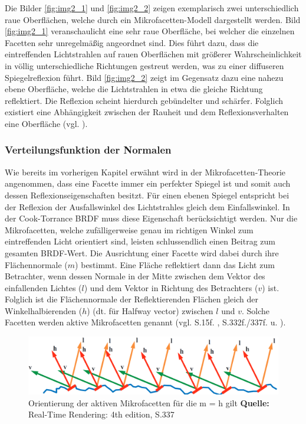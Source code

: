 \documentclass[
  11pt,
  a4paper,
  oneside
  ]{article}
\begin{document}
Die Bilder \ref{fig:img2_1} und \ref{fig:img2_2} zeigen exemplarisch zwei unterschiedlich raue Oberflächen, welche durch ein Mikrofacetten-Modell dargestellt werden. Bild \ref{fig:img2_1} veranschaulicht eine sehr raue Oberfläche, bei welcher die einzelnen Facetten sehr unregelmäßig angeordnet sind. Dies führt dazu, dass die eintreffenden Lichtstrahlen auf rauen Oberflächen mit größerer Wahrscheinlichkeit in völlig unterschiedliche Richtungen gestreut werden, was zu einer diffuseren Spiegelreflexion führt. Bild \ref{fig:img2_2} zeigt im Gegensatz dazu eine nahezu ebene Oberfläche, welche die Lichtstrahlen in etwa die gleiche Richtung reflektiert. Die Reflexion scheint hierdurch gebündelter und schärfer. Folglich existiert eine Abhängigkeit zwischen der Rauheit und dem Reflexionsverhalten eine Oberfläche 
(vgl. \cite{learnOpenGL}). 

\subsubsection{Verteilungsfunktion der Normalen}\label{sec:ndf}
Wie bereits im vorherigen Kapitel erwähnt wird in der Mikrofacetten-Theorie angenommen, dass eine Facette immer ein perfekter Spiegel ist und somit auch dessen Reflexionseigenschaften besitzt. Für einen ebenen Spiegel entspricht bei der Reflexion der Ausfallswinkel des Lichtstrahles gleich dem Einfallswinkel. In der Cook-Torrance BRDF muss diese Eigenschaft berücksichtigt werden. Nur die Mikrofacetten, welche zufälligerweise genau im richtigen Winkel zum eintreffenden Licht orientiert sind, leisten schlussendlich einen Beitrag zum gesamten BRDF-Wert. Die Ausrichtung einer Facette wird dabei durch ihre Flächennormale ($m$) bestimmt. Eine Fläche reflektiert dann das Licht zum Betrachter, wenn dessen Normale in der Mitte zwischen dem Vektor des einfallenden Lichtes ($l$) und dem Vektor in Richtung des Betrachters ($v$) ist. Folglich ist die Flächennormale der Reflektierenden Flächen gleich der Winkelhalbierenden ($h$) (dt. für Halfway vector) zwischen $l$ und $v$. Solche Facetten werden aktive Mikrofacetten genannt
(vgl. S.15f. \cite{rtrPaper}, S.332f./337f. \cite{realTimeRendering4th} u. \cite{learnOpenGL}).
\begin{figure}[H]
  \centering
  \includegraphics*[width=0.9 \textwidth]{images/normalDistriFun.png}
  \caption{Orientierung der aktiven Mikrofacetten für die m = h gilt \footnotesize\textbf{Quelle:} Real-Time Rendering: 4th edition, S.337 \cite{realTimeRendering4th}}
  \label{fig:img7}
\end{figure}
\end{document}

